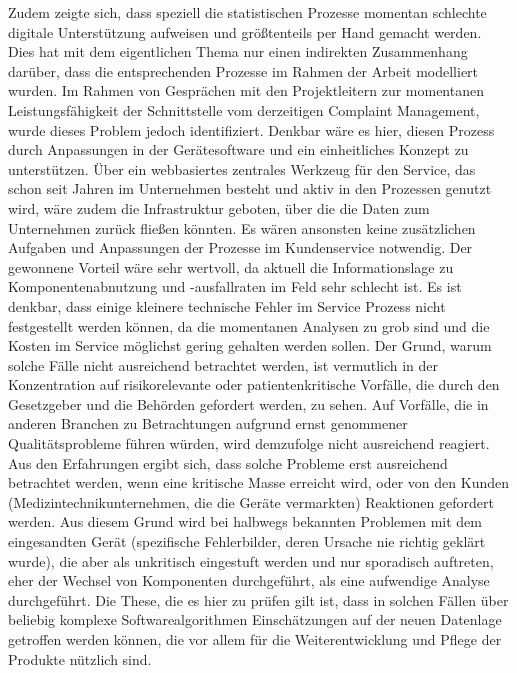\documentclass[a4paper,12pt]{report}
\begin{document}
Zudem zeigte sich, dass speziell die statistischen Prozesse momentan schlechte digitale Unterstützung aufweisen und größtenteils per Hand gemacht werden. Dies hat mit dem eigentlichen Thema nur einen indirekten Zusammenhang darüber, dass die entsprechenden Prozesse im Rahmen der Arbeit modelliert wurden. Im Rahmen von Gesprächen mit den Projektleitern zur momentanen Leistungsfähigkeit der Schnittstelle vom derzeitigen Complaint Management, wurde dieses Problem jedoch identifiziert. Denkbar wäre es hier, diesen Prozess durch Anpassungen in der Gerätesoftware und ein einheitliches Konzept zu unterstützen. Über ein webbasiertes zentrales Werkzeug für den Service, das schon seit Jahren im Unternehmen besteht und aktiv in den Prozessen genutzt wird, wäre zudem die Infrastruktur geboten, über die die Daten zum Unternehmen zurück fließen könnten. Es wären ansonsten keine zusätzlichen Aufgaben und Anpassungen der Prozesse im Kundenservice notwendig. Der gewonnene Vorteil wäre sehr wertvoll, da aktuell die Informationslage zu Komponentenabnutzung und -ausfallraten im Feld sehr schlecht ist. Es ist denkbar, dass einige kleinere technische Fehler  im Service Prozess nicht festgestellt werden können, da die momentanen Analysen zu grob sind und die Kosten im Service möglichst gering gehalten werden sollen. Der Grund, warum solche Fälle nicht ausreichend betrachtet werden, ist vermutlich in der Konzentration auf risikorelevante oder patientenkritische Vorfälle, die durch den Gesetzgeber und die Behörden gefordert werden, zu sehen. Auf Vorfälle, die in anderen Branchen zu Betrachtungen aufgrund ernst genommener Qualitätsprobleme führen würden, wird demzufolge nicht ausreichend reagiert. Aus den Erfahrungen ergibt sich, dass solche Probleme erst ausreichend betrachtet werden, wenn eine kritische Masse erreicht wird, oder von den Kunden (Medizintechnikunternehmen, die die Geräte vermarkten) Reaktionen gefordert werden. Aus diesem Grund wird bei halbwegs bekannten Problemen mit dem eingesandten Gerät (spezifische Fehlerbilder, deren Ursache nie richtig geklärt wurde), die aber als unkritisch eingestuft werden und nur sporadisch auftreten, eher der Wechsel von Komponenten durchgeführt, als eine aufwendige Analyse durchgeführt. Die These, die es hier zu prüfen gilt ist, dass in solchen Fällen über beliebig komplexe Softwarealgorithmen Einschätzungen auf der neuen Datenlage getroffen werden können, die vor allem für die Weiterentwicklung und Pflege der Produkte nützlich sind.
\end{document}
